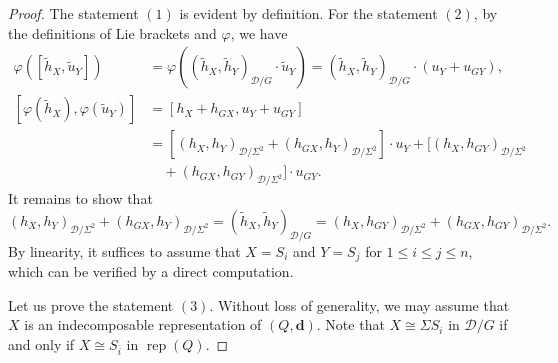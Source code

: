 \documentclass[12pt,reqno]{amsart}
\numberwithin{equation}{section}
\newcommand{\rep}{\operatorname{rep}\nolimits}
\begin{document}
	\begin{proof}
		The statement $(1)$ is evident by definition. For the statement $(2)$, by the definitions of Lie brackets and $\varphi$, we have 
		\begin{align*}
			\varphi([\tilde{h}_{X} ,\tilde{u}_{Y}])&=\varphi((\tilde{h}_{{X}},\tilde{h}_{{Y}})_{\mathcal{D}/G} \cdot \tilde{u}_{{Y}})= (\tilde{h}_{{X}},\tilde{h}_{{Y}})_{\mathcal{D}/G} \cdot (u_Y+u_{GY}), \\
			[\varphi(\tilde{h}_{{X}}),\varphi(\tilde{u}_{{Y}})]&=[h_X+h_{GX},u_Y+u_{GY}]\\
			&=[(h_X,h_Y)_{\mathcal{D}/\Sigma^2}+(h_{GX},h_Y)_{\mathcal{D}/\Sigma^2}]\cdot u_Y 
			+[(h_X,h_{GY})_{\mathcal{D}/\Sigma^2}\\
			&\quad+(h_{GX},h_{GY})_{\mathcal{D}/\Sigma^2}]\cdot u_{GY}.
		\end{align*}
		It remains to show that 
		\[
		(h_X,h_Y)_{\mathcal{D}/\Sigma^2}+(h_{GX},h_Y)_{\mathcal{D}/\Sigma^2} 
		=(\tilde{h}_{{X}},\tilde{h}_{{Y}})_{\mathcal{D}/G}
		=
		(h_X,h_{GY})_{\mathcal{D}/\Sigma^2}+(h_{GX},h_{GY})_{\mathcal{D}/\Sigma^2}.
		\]
		By linearity, it suffices to assume that $X=S_i$ and $Y=S_j$ for $1\leq i\leq j\leq n$, which can be verified by a direct computation.
		
		Let us prove the statement $(3)$. Without loss of generality, we may assume that $X$ is an indecomposable representation of $(Q,\mathbf{d})$. Note that $X\cong \Sigma S_i$ in $\mathcal{D}/G$ if and only if $X\cong S_{\bar{i}}$ in $\rep(Q)$.
		

\end{proof}
\end{document}
